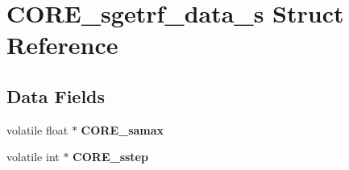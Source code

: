 \hypertarget{structCORE__sgetrf__data__s}{}\section{C\+O\+R\+E\+\_\+sgetrf\+\_\+data\+\_\+s Struct Reference}
\label{structCORE__sgetrf__data__s}
\subsection*{Data Fields}
\begin{DoxyCompactItemize}
\item 
\hypertarget{structCORE__sgetrf__data__s_a9e37c1d826b44d4a020eafa69e748835}{}volatile float $\ast$ {\bfseries C\+O\+R\+E\+\_\+samax}\label{structCORE__sgetrf__data__s_a9e37c1d826b44d4a020eafa69e748835}

\item 
\hypertarget{structCORE__sgetrf__data__s_a991f32f7f3f2692fcfec8ee2d0f5062b}{}volatile int $\ast$ {\bfseries C\+O\+R\+E\+\_\+sstep}\label{structCORE__sgetrf__data__s_a991f32f7f3f2692fcfec8ee2d0f5062b}

\end{DoxyCompactItemize}
